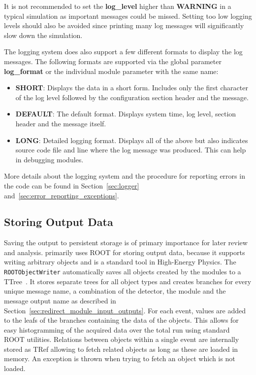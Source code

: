 \begin{warning}
    It is not recommended to set the \textbf{log\_level} higher than \textbf{WARNING} in a typical simulation as important messages could be missed.
    Setting too low logging levels should also be avoided since printing many log messages will significantly slow down the simulation.
\end{warning}

The logging system does also support a few different formats to display the log messages.
The following formats are supported via the global parameter \textbf{log\_format} or the individual module parameter with the same name:
\begin{itemize}
\item \textbf{SHORT}: Displays the data in a short form.
Includes only the first character of the log level followed by the configuration section header and the message.
\item \textbf{DEFAULT}: The default format.
Displays system time, log level, section header and the message itself.
\item \textbf{LONG}: Detailed logging format.
Displays all of the above but also indicates source code file and line where the log message was produced.
This can help in debugging modules.
\end{itemize}

More details about the logging system and the procedure for reporting errors in the code can be found in Section~\ref{sec:logger} and~\ref{sec:error_reporting_exceptions}.

\subsection{Storing Output Data}
\label{sec:storing_output_data}
Saving the output to persistent storage is of primary importance for later review and analysis.
\apsq primarily uses ROOT for storing output data, because it supports writing arbitrary objects and is a standard tool in High-Energy Physics.
The \texttt{ROOTObjectWriter} automatically saves all objects created by the modules to a TTree~\cite{roottree}.
It stores separate trees for all object types and creates branches for every unique message name, a combination of the detector, the module and the message output name as described in Section~\ref{sec:redirect_module_input_outputs}.
For each event, values are added to the leafs of the branches containing the data of the objects.
This allows for easy histogramming of the acquired data over the total run using standard ROOT utilities.
Relations between objects within a single event are internally stored as TRef allowing to fetch related objects as long as these are loaded in memory.
An exception is thrown when trying to fetch an object which is not loaded.

